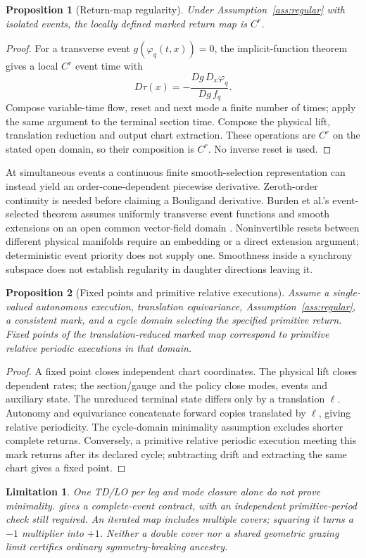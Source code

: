 \documentclass[11pt]{article}
\newtheorem{proposition}{Proposition}
\newtheorem{limitation}{Limitation}
\newcommand{\code}[1]{\texttt{\detokenize{#1}}}
\begin{document}
\begin{proposition}[Return-map regularity]
Under Assumption~\ref{ass:regular} with isolated events, the locally defined
marked return map is $C^r$.
\end{proposition}
\begin{proof}
For a transverse event $g(\varphi_q(t,x))=0$, the implicit-function theorem
gives a local $C^r$ event time with
\[
D\tau(x)=-\frac{Dg\,D_x\varphi_q}{Dg\,f_q}.
\]
Compose variable-time flow, reset and next mode a finite number of times;
apply the same argument to the terminal section time. Compose the physical
lift, translation reduction and output chart extraction. These operations
are $C^r$ on the stated open domain, so their composition is $C^r$.
No inverse reset is used.
\end{proof}
At simultaneous events a continuous finite smooth-selection representation
can instead yield an order-cone-dependent piecewise derivative. Zeroth-order
continuity is needed before claiming a Bouligand derivative. Burden et al.'s
event-selected theorem assumes uniformly transverse event functions and
smooth extensions on an open common vector-field domain
\cite{burden}. Noninvertible resets between different physical manifolds
require an embedding or a direct extension argument; deterministic event
priority does not supply one. Smoothness inside a synchrony subspace does
not establish regularity in daughter directions leaving it.

\begin{proposition}[Fixed points and primitive relative executions]
Assume a single-valued autonomous execution, translation equivariance,
Assumption~\ref{ass:regular}, a consistent mark, and a cycle domain selecting
the specified primitive return. Fixed points of the translation-reduced
marked map correspond to primitive relative periodic executions in that
domain.
\end{proposition}
\begin{proof}
A fixed point closes independent chart coordinates. The physical lift closes
dependent rates; the section/gauge and the policy close modes, events and
auxiliary state. The unreduced terminal state differs only by a translation
$\ell$. Autonomy and equivariance concatenate forward copies translated by
$\ell$, giving relative periodicity. The cycle-domain minimality assumption
excludes shorter complete returns. Conversely, a primitive relative periodic
execution meeting this mark returns after its declared cycle; subtracting
drift and extracting the same chart gives a fixed point.
\end{proof}
\begin{limitation}
One TD/LO per leg and mode closure alone do not prove minimality.
\code{EventCycleReturnPolicy_v3} gives a complete-event contract, with an
independent primitive-period check still required. An iterated map includes
multiple covers; squaring it turns a $-1$ multiplier into $+1$. Neither a
double cover nor a shared geometric grazing limit certifies ordinary
symmetry-breaking ancestry.
\end{limitation}
\end{document}
